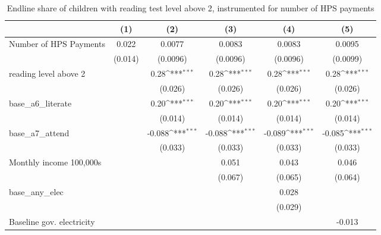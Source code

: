 \begin{table}[htbp]\centering
\def\sym#1{\ifmmode^{#1}\else\(^{#1}\)\fi}
\caption{Endline share of children with reading test level above 2, instrumented for number of HPS payments}
\begin{tabular*}{1\hsize}{@{\hskip\tabcolsep\extracolsep\fill}l*{5}{c}}
\toprule
                &\multicolumn{1}{c}{(1)}         &\multicolumn{1}{c}{(2)}         &\multicolumn{1}{c}{(3)}         &\multicolumn{1}{c}{(4)}         &\multicolumn{1}{c}{(5)}         \\
\midrule
Number of HPS Payments&    0.022         &   0.0077         &   0.0083         &   0.0083         &   0.0095         \\
                &  (0.014)         & (0.0096)         & (0.0096)         & (0.0096)         & (0.0099)         \\
reading level above 2&                  &     0.28\sym{***}&     0.28\sym{***}&     0.28\sym{***}&     0.28\sym{***}\\
                &                  &  (0.026)         &  (0.026)         &  (0.026)         &  (0.026)         \\
base\_a6\_literate&                  &     0.20\sym{***}&     0.20\sym{***}&     0.20\sym{***}&     0.20\sym{***}\\
                &                  &  (0.014)         &  (0.014)         &  (0.014)         &  (0.014)         \\
base\_a7\_attend  &                  &   -0.088\sym{***}&   -0.088\sym{***}&   -0.089\sym{***}&   -0.085\sym{***}\\
                &                  &  (0.033)         &  (0.033)         &  (0.033)         &  (0.033)         \\
Monthly income 100,000s&                  &                  &    0.051         &    0.043         &    0.046         \\
                &                  &                  &  (0.067)         &  (0.065)         &  (0.064)         \\
base\_any\_elec   &                  &                  &                  &    0.028         &                  \\
                &                  &                  &                  &  (0.029)         &                  \\
Baseline gov. electricity&                  &                  &                  &                  &   -0.013         \\

\end{tabular*}
\end{table}
